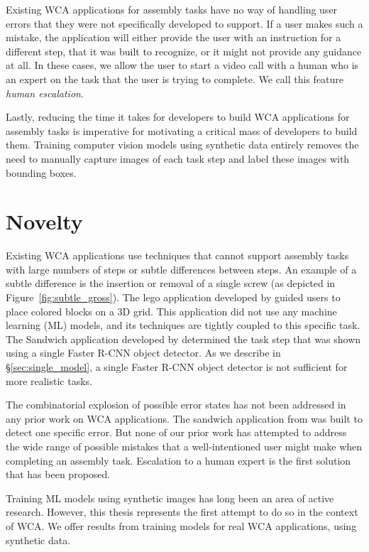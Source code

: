 Existing WCA applications for assembly tasks have no way of handling user
errors that they were not specifically developed to support.
If a user makes such a mistake, the application will either provide
the user with an instruction for a different step, that it was built to
recognize, or it might not provide any guidance at all.
In these cases, we allow the user to start a video call with a human who is
an expert on the task that the user is trying to complete.
We call this feature \emph{human escalation}.

Lastly, reducing the time it takes for developers to build WCA applications for
assembly tasks is imperative for motivating a critical mass of developers to
build them.
Training computer vision models using synthetic data entirely removes the need
to manually capture images of each task step and label these images with
bounding boxes.

\section{Novelty}

Existing WCA applications use techniques that cannot support assembly tasks
with large numbers of steps or subtle differences between steps.
An example of a subtle difference is the insertion or removal of a single
screw (as depicted in Figure~{\ref{fig:subtle_gross}}).
The lego application developed by \citet{chen2017} guided users to place colored
blocks on a 3D grid.
This application did not use any machine learning (ML) models, and its
techniques are tightly coupled to this specific task.
The Sandwich application developed by \citet{chen2017} determined the task step
that was shown using a single Faster R-CNN object detector.
As we describe in \S\ref{sec:single_model}, a single Faster R-CNN object
detector is not sufficient for more realistic tasks.

The combinatorial explosion of possible error states has not been addressed in
any prior work on WCA applications.
The sandwich application from \citet{chen2017} was built to detect one specific
error.
But none of our prior work has attempted to address the wide range of possible
mistakes that a well-intentioned user might make when completing an assembly
task.
Escalation to a human expert is the first solution that has been proposed.

Training ML models using synthetic images has long been an area of active
research.
However, this thesis represents the first attempt to do so in the context of
WCA.
We offer results from training models for real WCA applications, using synthetic
data.

